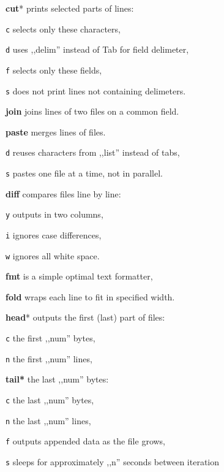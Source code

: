 \begin{enumx}
	\item [\cmd] \textbf{cut}* prints selected parts of lines:
	\item [\texttt{c}] selects only these characters,
	\item [\texttt{d}] uses ,,delim'' instead of Tab for field delimeter,
	\item [\texttt{f}] selects only these fields,
	\item [\texttt{s}] does not print lines not containing delimeters.
	\item [\cmd] \textbf{join} joins lines of two files on a common field.
	\item [\cmd] \textbf{paste} merges lines of files.
	\item [\texttt{d}] reuses characters from ,,list'' instead of tabs,
	\item [\texttt{s}] pastes one file at a time, not in parallel.
\end{enumx}

\begin{enumx}
	\item [\cmd] \textbf{diff} compares files line by line:
	\item [\texttt{y}] outputs in two columns,
	\item [\texttt{i}] ignores case differences,
	\item [\texttt{w}] ignores all white space.
\end{enumx}

\begin{enumx}
	\item [\cmd] \textbf{fmt} is a simple optimal text formatter, 
	\item [\cmd] \textbf{fold} wraps each line to fit in specified width.
\end{enumx}

\begin{enumx}
	\item [\cmd] \textbf{head}* outputs the first (last) part of files:
	\item [\texttt{c}] the first ,,num'' bytes,
	\item [\texttt{n}] the first ,,num'' lines,
	\item [\cmd] \textbf{tail*} the last ,,num'' bytes:
	\item [\texttt{c}] the last ,,num'' bytes,
	\item [\texttt{n}] the last ,,num'' lines,
	\item [\texttt{f}] outputs appended data as the file grows,
	\item [\texttt{s}] sleeps for approximately ,,n'' seconds between iteration 
\end{enumx}

